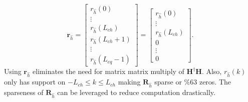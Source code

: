 \begin{equation}
\mathbf{r}_{\hat{h}} = 
\begin{bmatrix} r_{\hat{h}}(0) \\ \vdots \\ r_{\hat{h}}(L_{ch}) \\ r_{\hat{h}}(L_{ch}+1) \\ \vdots \\ r_{\hat{h}}(L_{eq}-1)\end{bmatrix} =
\begin{bmatrix} r_{\hat{h}}(0) \\ \vdots \\ r_{\hat{h}}(L_{ch}) \\ 0 \\ \vdots \\ 0  \end{bmatrix}.
\end{equation} 
Using $\mathbf{r}_{\hat{h}}$ eliminates the need for matrix matrix multiply of $\mathbf{H}^\dagger\mathbf{H}$.
Also, $r_{\hat{h}}(k)$ only has support on $-L_{ch} \leq k \leq L_{ch}$ making $\mathbf{R}_{\hat{h}}$ sparse or $\%63$ zeros.
The sparseness of $\mathbf{R}_{\hat{h}}$ can be leveraged to reduce computation drastically.

